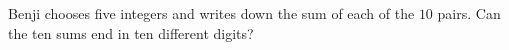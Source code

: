 Benji chooses five integers and writes down the sum of each of the $10$ pairs. Can the ten sums end in ten different digits?
